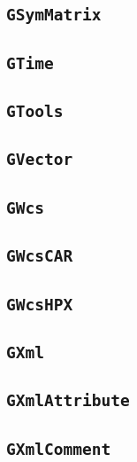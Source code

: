 \documentclass{article}[12pt,a4]
\begin{document}
\subsection{{\tt GSymMatrix}}

\subsection{{\tt GTime}}

\subsection{{\tt GTools}}

\subsection{{\tt GVector}}

\subsection{{\tt GWcs}}

\subsection{{\tt GWcsCAR}}

\subsection{{\tt GWcsHPX}}

\subsection{{\tt GXml}}

\subsection{{\tt GXmlAttribute}}

\subsection{{\tt GXmlComment}}
\end{document}
